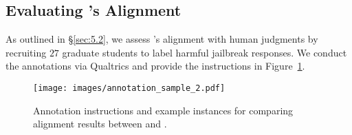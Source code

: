 \clearpage

\subsection{Evaluating \harmscore's Alignment}
\label{app:metric_eval}

As outlined in \S\ref{sec:5.2}, we assess \harmscore's alignment with human judgments by recruiting $27$ graduate students to label harmful jailbreak responses.
We conduct the annotations via Qualtrics and provide the instructions in Figure~\ref{fig:annotation_diagram_2}.

\begin{figure}[ht]
    \centering
    \texttt{[image: images/annotation\_sample\_2.pdf]}
    \caption{Annotation instructions and example instances for comparing alignment results between \asr and \harmscore.}
    \label{fig:annotation_diagram_2}
\end{figure}

\clearpage